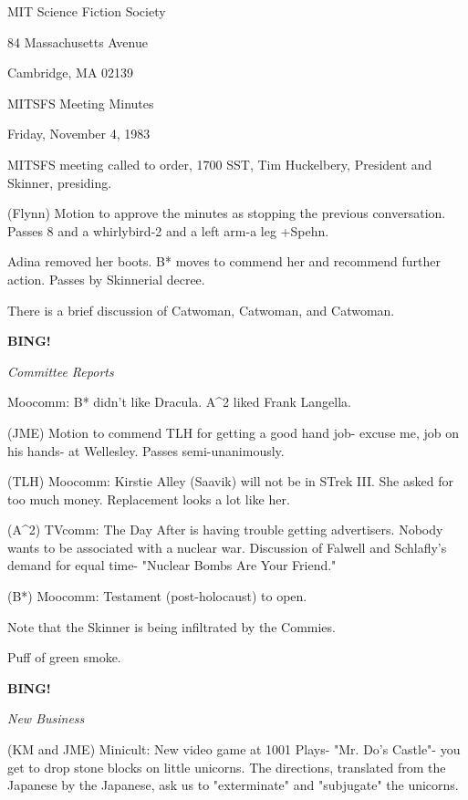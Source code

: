 \documentclass[12pt]{article}
\newcommand{\bing}{{\bf BING!} }
\newcommand{\goto}[1]{\bing \vskip 12pt \centerline{{\em{#1}}}}
\begin{document}
\begin{center}

MIT Science Fiction Society 

84 Massachusetts Avenue

Cambridge, MA 02139

\vspace{12pt}

MITSFS Meeting Minutes 

Friday, November 4, 1983

\end{center}
 
\vspace{18pt}

\setlength{\parskip}{6pt}

\noindent
MITSFS meeting called to order, 1700 SST,
Tim Huckelbery, President and Skinner, presiding.

(Flynn) Motion to approve the minutes as stopping the previous conversation. Passes 8 and a whirlybird-2 and a left arm-a leg +Spehn.

Adina removed her boots. B* moves to commend her and recommend further action. Passes by Skinnerial decree.

There is a brief discussion of Catwoman, Catwoman, and Catwoman.

\goto{Committee Reports}

Moocomm: B* didn't like Dracula. A^2 liked Frank Langella.

(JME) Motion to commend TLH for getting a good hand job- excuse me, job on his hands- at Wellesley. Passes semi-unanimously.

(TLH) Moocomm: Kirstie Alley (Saavik) will not be in STrek III. She asked for too much money. Replacement looks a lot like her.

(A^2) TVcomm: The Day After is having trouble getting advertisers. Nobody wants to be associated with a nuclear war. Discussion of Falwell and Schlafly's demand for equal time- "Nuclear Bombs Are Your Friend."

(B*) Moocomm: Testament (post-holocaust) to open.

Note that the Skinner is being infiltrated by the Commies.

Puff of green smoke.

\goto{New Business}

(KM and JME) Minicult: New video game at 1001 Plays- "Mr. Do's Castle"- you get to drop stone blocks on little unicorns. The directions, translated from the Japanese by the Japanese, ask us to "exterminate" and "subjugate" the unicorns.
\end{document}

